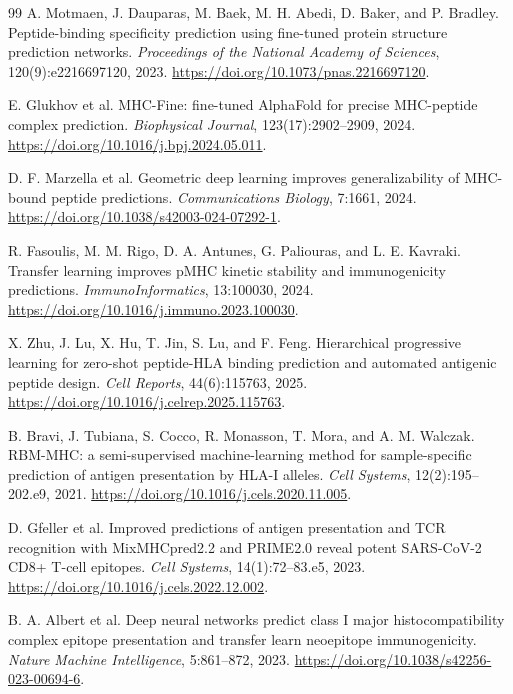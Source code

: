 \begin{thebibliography}{99}
A. Motmaen, J. Dauparas, M. Baek, M. H. Abedi, D. Baker, and P. Bradley.
\newblock Peptide-binding specificity prediction using fine-tuned protein structure prediction networks.
\newblock \emph{Proceedings of the National Academy of Sciences}, 120(9):e2216697120, 2023.
\newblock \url{https://doi.org/10.1073/pnas.2216697120}.

E. Glukhov et al.
\newblock MHC-Fine: fine-tuned AlphaFold for precise MHC-peptide complex prediction.
\newblock \emph{Biophysical Journal}, 123(17):2902--2909, 2024.
\newblock \url{https://doi.org/10.1016/j.bpj.2024.05.011}.

D. F. Marzella et al.
\newblock Geometric deep learning improves generalizability of MHC-bound peptide predictions.
\newblock \emph{Communications Biology}, 7:1661, 2024.
\newblock \url{https://doi.org/10.1038/s42003-024-07292-1}.

R. Fasoulis, M. M. Rigo, D. A. Antunes, G. Paliouras, and L. E. Kavraki.
\newblock Transfer learning improves pMHC kinetic stability and immunogenicity predictions.
\newblock \emph{ImmunoInformatics}, 13:100030, 2024.
\newblock \url{https://doi.org/10.1016/j.immuno.2023.100030}.

X. Zhu, J. Lu, X. Hu, T. Jin, S. Lu, and F. Feng.
\newblock Hierarchical progressive learning for zero-shot peptide-HLA binding prediction and automated antigenic peptide design.
\newblock \emph{Cell Reports}, 44(6):115763, 2025.
\newblock \url{https://doi.org/10.1016/j.celrep.2025.115763}.

B. Bravi, J. Tubiana, S. Cocco, R. Monasson, T. Mora, and A. M. Walczak.
\newblock RBM-MHC: a semi-supervised machine-learning method for sample-specific prediction of antigen presentation by HLA-I alleles.
\newblock \emph{Cell Systems}, 12(2):195--202.e9, 2021.
\newblock \url{https://doi.org/10.1016/j.cels.2020.11.005}.

D. Gfeller et al.
\newblock Improved predictions of antigen presentation and TCR recognition with MixMHCpred2.2 and PRIME2.0 reveal potent SARS-CoV-2 CD8+ T-cell epitopes.
\newblock \emph{Cell Systems}, 14(1):72--83.e5, 2023.
\newblock \url{https://doi.org/10.1016/j.cels.2022.12.002}.

B. A. Albert et al.
\newblock Deep neural networks predict class I major histocompatibility complex epitope presentation and transfer learn neoepitope immunogenicity.
\newblock \emph{Nature Machine Intelligence}, 5:861--872, 2023.
\newblock \url{https://doi.org/10.1038/s42256-023-00694-6}.


\end{thebibliography}
